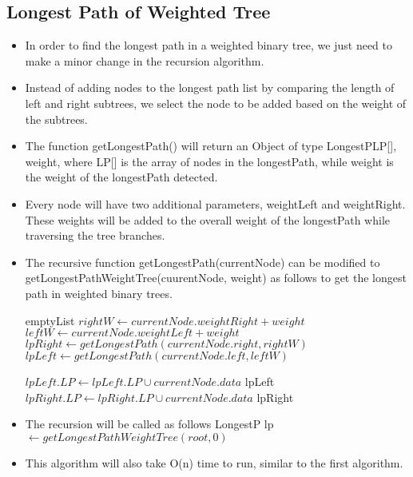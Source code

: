 \documentclass[12pt]{article}
\begin{document}
\subsection{Longest Path of Weighted  Tree}
\begin{itemize}
    \item In order to find the longest path in a weighted binary tree, we just need to make a minor change in the recursion algorithm.
    \item Instead of adding nodes to the longest path list by comparing the length of left and right subtrees, we select the node to be added based on the weight of the subtrees. 
    \item The function getLongestPath() will return an Object of type LongestP{LP[], weight}, where LP[] is the array of nodes in the longestPath, while weight is the weight of the longestPath detected.
    \item Every node will have two additional parameters, weightLeft and weightRight. These weights will be added to the overall weight of the longestPath while traversing the tree branches.
    \item The recursive function getLongestPath(currentNode) can be modified to getLongestPathWeightTree(cuurentNode, weight) as follows to get the longest path in weighted binary trees. 
    
    \begin{algorithm}[H]
    \begin{algorithmic}
    
    
        \State \Return emptyList
    \EndIf
    \State $rightW \gets currentNode.weightRight + weight$
    \State $leftW \gets currentNode.weightLeft + weight$
    \State $lpRight \gets getLongestPath(currentNode.right, rightW)$
    \State $lpLeft \gets getLongestPath(currentNode.left, leftW)$
    
        \State $lpLeft.LP \gets lpLeft.LP \cup currentNode.data$
        \State \Return lpLeft
    \Else
        \State $lpRight.LP \gets lpRight.LP \cup currentNode.data$
        \State \Return lpRight
    \EndIf
    
    \EndFunction
    \end{algorithmic}
    \end{algorithm}
    
    \item The recursion will be called as follows LongestP lp $\gets getLongestPathWeightTree(root, 0)$ 
    \item This algorithm will also take O(n) time to run, similar to the first algorithm.
\end{itemize}
\end{document}
